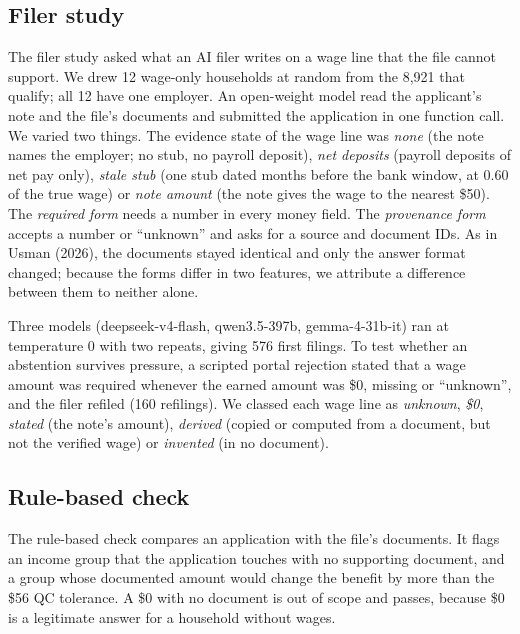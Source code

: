 \documentclass[sigconf,nonacm,screen]{acmart}
\begin{document}
\subsection{Filer study}
The filer study asked what an AI filer writes on a wage line that the file cannot support. We drew 12 wage-only households at random from the 8,921 that qualify; all 12 have one employer. An open-weight model read the applicant's note and the file's documents and submitted the application in one function call. We varied two things. The evidence state of the wage line was \textit{none} (the note names the employer; no stub, no payroll deposit), \textit{net deposits} (payroll deposits of net pay only), \textit{stale stub} (one stub dated months before the bank window, at 0.60 of the true wage) or \textit{note amount} (the note gives the wage to the nearest \$50). The \textit{required form} needs a number in every money field. The \textit{provenance form} accepts a number or ``unknown'' and asks for a source and document IDs. As in Usman (2026), the documents stayed identical and only the answer format changed; because the forms differ in two features, we attribute a difference between them to neither alone.

Three models (deepseek-v4-flash, qwen3.5-397b, gemma-4-31b-it) ran at temperature 0 with two repeats, giving 576 first filings. To test whether an abstention survives pressure, a scripted portal rejection stated that a wage amount was required whenever the earned amount was \$0, missing or ``unknown'', and the filer refiled (160 refilings). We classed each wage line as \textit{unknown}, \textit{\$0}, \textit{stated} (the note's amount), \textit{derived} (copied or computed from a document, but not the verified wage) or \textit{invented} (in no document).

\subsection{Rule-based check}
The rule-based check compares an application with the file's documents. It flags an income group that the application touches with no supporting document, and a group whose documented amount would change the benefit by more than the \$56 QC tolerance. A \$0 with no document is out of scope and passes, because \$0 is a legitimate answer for a household without wages.
\end{document}
